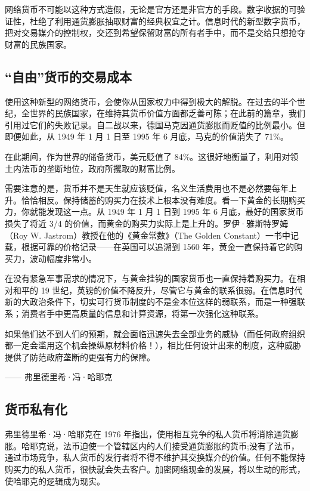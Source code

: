 网络货币不可能以这种方式造假，无论是官方还是非官方的手段。数字收据的可验证性，杜绝了利用通货膨胀抽取财富的经典权宜之计。信息时代的新型数字货币，把对交易媒介的控制权，交还到希望保留财富的所有者手中，而不是交给只想抢夺财富的民族国家。

\subsection{“自由”货币的交易成本}
使用这种新型的网络货币，会使你从国家权力中得到极大的解脱。在过去的半个世纪，全世界的民族国家，在维持其货币价值方面都乏善可陈；在此前的篇章，我们引用过它们的失败记录。自二战以来，德国马克因通货膨胀而贬值的比例最小。但即便如此，从 1949 年 1 月 1 日至 1995 年 6 月底，马克的价值消失了 71\%。

在此期间，作为世界的储备货币，美元贬值了 84\%。这很好地衡量了，利用对领土内法币的垄断地位，政府所攫取的财富比例。

需要注意的是，货币并不是天生就应该贬值，名义生活费用也不是必然要每年上升。恰恰相反。保持储蓄的购买力在技术上根本没有难度。看一下黄金的长期购买力，你就能发现这一点。从 1949 年 1 月 1 日到 1995 年 6 月底，最好的国家货币损失了将近 3/4 的价值，而黄金的购买力实际上是上升的。罗伊·雅斯特罗姆（Roy W. Jastrom）教授在他的《黄金常数》（The Golden Constant）一书中记载，根据可靠的价格记录——在英国可以追溯到 1560 年，黄金一直保持着它的购买力，波动幅度非常小。

在没有紧急军事需求的情况下，与黄金挂钩的国家货币也一直保持着购买力。在相对和平的 19 世纪，英镑的价值不降反升，尽管它与黄金的联系很弱。在信息时代新的大政治条件下，切实可行货币制度的不是金本位这样的弱联系，而是一种强联系；消费者手中更高质量的信息和计算资源，将第一次强化这种联系。


\begin{tcolorbox}
如果他们达不到人们的预期，就会面临迅速失去全部业务的威胁（而任何政府组织都一定会滥用这个机会操纵原材料价格！），相比任何设计出来的制度，这种威胁提供了防范政府垄断的更强有力的保障。
\begin{flushright}
—— 弗里德里希·冯·哈耶克  
\end{flushright}
\end{tcolorbox}

\subsection{货币私有化}
弗里德里希·冯·哈耶克在 1976 年指出，使用相互竞争的私人货币将消除通货膨胀。哈耶克说，法币迫使一个管辖区内的人们接受通货膨胀的货币;没有了法币，通过市场竞争，私人货币的发行者将不得不维护其交换媒介的价值。任何不能保持购买力的私人货币，很快就会失去客户。加密网络现金的发展，将以生动的形式，使哈耶克的逻辑成为现实。

